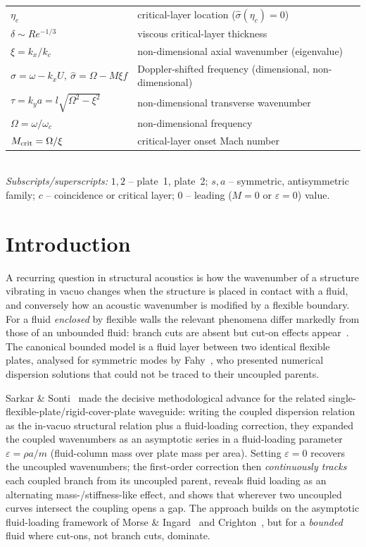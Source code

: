 \documentclass[11pt]{article}
\newcommand{\eps}{\varepsilon}
\begin{document}
\begin{tabular}{@{}ll@{}}
$\eta_c$ & critical-layer location ($\hat\sigma(\eta_c)=0$)\\
$\delta\sim Re^{-1/3}$ & viscous critical-layer thickness\\
$\xi=k_x/k_c$ & non-dimensional axial wavenumber (eigenvalue)\\
$\sigma=\omega-k_xU,\ \hat\sigma=\Omega-M\xi f$ & Doppler-shifted frequency (dimensional, non-dimensional)\\
$\tau=k_ya=l\sqrt{\Omega^2-\xi^2}$ & non-dimensional transverse wavenumber\\
$\Omega=\omega/\omega_c$ & non-dimensional frequency\\
$M_{\rm crit}=\Omega/\xi$ & critical-layer onset Mach number\\
\end{tabular}\\[0.5ex]
\noindent\emph{Subscripts/superscripts:} $1,2$ -- plate~1, plate~2; $s,a$ -- symmetric, antisymmetric
family; $c$ -- coincidence or critical layer; $0$ -- leading ($M=0$ or $\varepsilon=0$) value.

\section{Introduction}
A recurring question in structural acoustics is how the wavenumber of a structure vibrating in vacuo
changes when the structure is placed in contact with a fluid, and conversely how an acoustic
wavenumber is modified by a flexible boundary. For a fluid \emph{enclosed} by flexible walls the
relevant phenomena differ markedly from those of an unbounded fluid: branch cuts are absent but
cut-on effects appear~\cite{fahy,morseingard}. The canonical bounded model is a fluid layer between
two identical flexible plates, analysed for symmetric modes by Fahy~\cite{fahy}, who presented
numerical dispersion solutions that could not be traced to their uncoupled parents.

Sarkar \& Sonti~\cite{sarkarsonti} made the decisive methodological advance for the related
single-flexible-plate/rigid-cover-plate waveguide: writing the coupled dispersion relation as the
in-vacuo structural relation plus a fluid-loading correction, they expanded the coupled wavenumbers
as an asymptotic series in a fluid-loading parameter $\eps=\rho a/m$ (fluid-column mass over plate
mass per area). Setting $\eps=0$ recovers the uncoupled wavenumbers; the first-order correction then
\emph{continuously tracks} each coupled branch from its uncoupled parent, reveals fluid loading as an
alternating mass-/stiffness-like effect, and shows that wherever two uncoupled curves intersect the
coupling opens a gap. The approach builds on the asymptotic fluid-loading framework of Morse \&
Ingard~\cite{morseingard} and Crighton~\cite{crighton}, but for a \emph{bounded} fluid where cut-ons,
not branch cuts, dominate.
\end{document}
